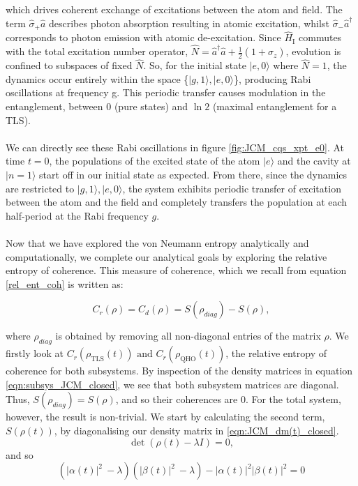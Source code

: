 \documentclass[12pt]{article}
\begin{document}
which drives coherent exchange of excitations between the atom and field. The term $\hat{\sigma}_{+}\hat{a}$ describes photon absorption resulting in atomic excitation, whilst $\hat{\sigma}_{-}\hat{a}^\dagger$ corresponds to photon emission with atomic de-excitation. Since $\hat{H}_{\scriptscriptstyle\text{I}}$ commutes with the total excitation number operator, $\hat{N} = \hat{a}^\dagger \hat{a} + \frac{1}{2}(1 + \hat{\sigma}_z)$, evolution is confined to subspaces of fixed $\hat{N}$. So, for the initial state $|e,0\rangle$ where $\hat{N} = 1$, the dynamics occur entirely within the space \small{\{$|g,1\rangle,|e,0\rangle$\}}, producing Rabi oscillations at frequency g. This periodic transfer causes modulation in the entanglement, between  0 (pure states) and $\ln2$ (maximal entanglement for a TLS).\\
\\
We can directly see these Rabi oscillations in figure \ref{fig:JCM_cqs_xpt_e0}. At time $t = 0$, the populations of the excited state of the atom $|e\rangle$ and the cavity at  $|n=1\rangle$ start off in our initial state as expected. From there, since the dynamics are restricted to \small{{$|g,1\rangle,|e,0\rangle$}}, the system exhibits periodic transfer of excitation between the atom and the field and completely transfers the population at each half-period at the Rabi frequency $g$.\\
\\
Now that we have explored the von Neumann entropy analytically and computationally, we complete our analytical goals by exploring the relative entropy of coherence. This measure of coherence, which we recall from equation \eqref{rel_ent_coh} is written as:


\begin{equation*}
C_r(\rho) = C_d(\rho) = S(\rho_{diag}) - S(\rho),
\end{equation*}

where $\rho_{diag}$ is obtained by removing all non-diagonal entries of the matrix $\rho$. We firstly look at $C_r(\rho_{\scriptscriptstyle \text{TLS}}(t)) \text{ and }  C_r(\rho_{\scriptscriptstyle \text{QHO}}(t))$, the relative entropy of coherence for both subsystems. By inspection of the density matrices in equation \eqref{eqn:subsys_JCM_closed}, we see that both subsystem matrices are diagonal. Thus, $S(\rho_{diag}) = S(\rho)$, and so their coherences are $0$. For the total system, however, the result is non-trivial. We start by calculating the second term, $S(\rho(t))$, by diagonalising our density matrix in \eqref{eqn:JCM_dm(t)_closed}.
\begin{equation*}
    \det(\rho(t) - \lambda I) = 0,
\end{equation*}
and so 
\begin{equation*}
    \left(|\alpha(t)|^2\ - \lambda\right) \left(|\beta(t)|^2\ - \lambda \right) - |\alpha(t)|^2|\beta(t)|^2 =0
\end{equation*}
\end{document}
